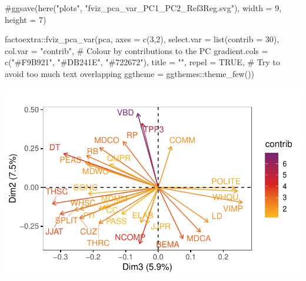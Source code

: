 \documentclass[
  letterpaper,
  DIV=11,
  numbers=noendperiod]{scrreprt}
\newenvironment{Shaded}{\begin{snugshade}}{\end{snugshade}}
\newcommand{\AttributeTok}[1]{\textcolor[rgb]{0.40,0.45,0.13}{#1}}
\newcommand{\CommentTok}[1]{\textcolor[rgb]{0.37,0.37,0.37}{#1}}
\newcommand{\ConstantTok}[1]{\textcolor[rgb]{0.56,0.35,0.01}{#1}}
\newcommand{\DecValTok}[1]{\textcolor[rgb]{0.68,0.00,0.00}{#1}}
\newcommand{\FunctionTok}[1]{\textcolor[rgb]{0.28,0.35,0.67}{#1}}
\newcommand{\NormalTok}[1]{\textcolor[rgb]{0.00,0.23,0.31}{#1}}
\newcommand{\SpecialCharTok}[1]{\textcolor[rgb]{0.37,0.37,0.37}{#1}}
\newcommand{\StringTok}[1]{\textcolor[rgb]{0.13,0.47,0.30}{#1}}
\begin{document}
\begin{Shaded}
\begin{Highlighting}[]
\CommentTok{\#ggsave(here("plots", "fviz\_pca\_var\_PC1\_PC2\_Ref3Reg.svg"), width = 9, height = 7)}

\NormalTok{factoextra}\SpecialCharTok{::}\FunctionTok{fviz\_pca\_var}\NormalTok{(pca,}
             \AttributeTok{axes =} \FunctionTok{c}\NormalTok{(}\DecValTok{3}\NormalTok{,}\DecValTok{2}\NormalTok{),}
             \AttributeTok{select.var =} \FunctionTok{list}\NormalTok{(}\AttributeTok{contrib =} \DecValTok{30}\NormalTok{),}
             \AttributeTok{col.var =} \StringTok{"contrib"}\NormalTok{, }\CommentTok{\# Colour by contributions to the PC}
             \AttributeTok{gradient.cols =} \FunctionTok{c}\NormalTok{(}\StringTok{"\#F9B921"}\NormalTok{, }\StringTok{"\#DB241E"}\NormalTok{, }\StringTok{"\#722672"}\NormalTok{),}
             \AttributeTok{title =} \StringTok{""}\NormalTok{,}
             \AttributeTok{repel =} \ConstantTok{TRUE}\NormalTok{, }\CommentTok{\# Try to avoid too much text overlapping}
             \AttributeTok{ggtheme =}\NormalTok{ ggthemes}\SpecialCharTok{::}\FunctionTok{theme\_few}\NormalTok{())}
\end{Highlighting}
\end{Shaded}

\includegraphics{AppendixH_files/figure-pdf/graphs-of-variables-2.pdf}
\end{document}
